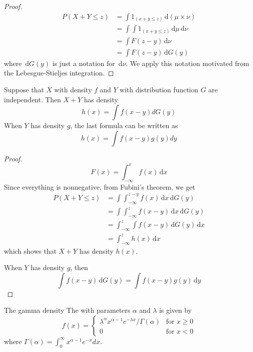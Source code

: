\documentclass[../main.tex]{subfiles}
\begin{document}
\begin{proof}
    \[
   \begin{aligned}
    P\left( X+ Y\le z \right)&=  \int 1_{\left( x+ y \le z\right) }\,\mathrm{d} \left( \mu \times \nu  \right)\\ 
     &=   \int \int 1_{\left( x+ y\le z \right) } \,\mathrm{d} \mu  \,\mathrm{d} \nu \\ 
      &=  \int F\left( z-y \right)\,\mathrm{d} \nu \\ 
       &=  \int F\left( z-y \right) \,\mathrm{d} G\left( y \right)   
   \end{aligned} 
    \]where \(  \,\mathrm{d} G\left( y \right)   \) is just a notation for \(  \,\mathrm{d} \nu   \).  We apply this notation motivated from the Lebesgue-Stieljes integration.  
\end{proof}

\begin{theorem}{}{}
Suppose that $X$ with density $f$ and $Y$ with distribution function $G$ are independent. Then $X + Y$ has density
\[
h(x) = \int f(x - y)dG(y)
\]
When $Y$ has density $g$, the last formula can be written as
\[
h(x) = \int f(x - y) g(y)dy
\]
\end{theorem}

\begin{proof}
     \[
     F\left( x \right)=  \int_{-\infty}^{x}f\left( x \right)\,\mathrm{d} x  
     \] Since everything is nonnegative, from Fubini's theorem, we get\[
  \begin{aligned}
     P\left( X+ Y\le z \right)&=  \int \int_{-\infty}^{z-y}f\left( x \right)\,\mathrm{d} x \,\mathrm{d} G\left( y \right)    \\ 
      &=  \int \int_{-\infty}^{z}f\left( x- y \right)\,\mathrm{d} x\,\mathrm{d} G\left( y \right)\\ 
       &= \int_{-\infty}^{z}\int f\left( x-y \right)\,\mathrm{d} G\left( y \right)\,\mathrm{d} x  \\ 
        &=  \int_{-\infty}^{z} h\left( x \right)\,\mathrm{d} x   
  \end{aligned}
     \] which shows that \(  X+ Y   \) has density \(  h\left( x \right)   \). 
     
     When \(  Y  \) has density \(  g  \), then \[
    \int f\left( x-y \right)\,\mathrm{d}  G\left( y \right)=   \int f\left( x-y \right) g\left( y \right)\,\mathrm{d} y 
     \] 
\end{proof}
\begin{example}{The gamma density}{}
The  with parameters $\alpha$ and $\lambda$ is given by
\[
f(x) = \begin{cases}
\lambda^\alpha x^{\alpha-1}e^{-\lambda x} / \Gamma(\alpha) & \text{for } x \geq 0 \\
0 & \text{for } x < 0
\end{cases}
\]
where $\Gamma(\alpha) = \int_0^\infty x^{\alpha-1}e^{-x}dx$.
\end{example}
\end{document}

